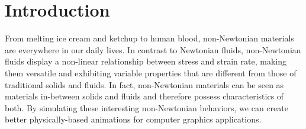 \documentclass[10pt,journal,compsoc]{IEEEtran}
\begin{document}
\maketitle

\IEEEpeerreviewmaketitle

\IEEEdisplaynontitleabstractindextext






\section{Introduction}


From melting ice cream and ketchup to human blood, non-Newtonian materials are everywhere in our daily lives. In contrast to Newtonian fluids, non-Newtonian fluids display a non-linear relationship between stress and strain rate, making them versatile and exhibiting variable properties that are different from those of traditional solids and fluids. In fact, non-Newtonian materials can be seen as materials in-between solids and fluids and therefore possess characteristics of both. By simulating these interesting non-Newtonian behaviors, we can create better physically-based animations for computer graphics applications.
\end{document}
